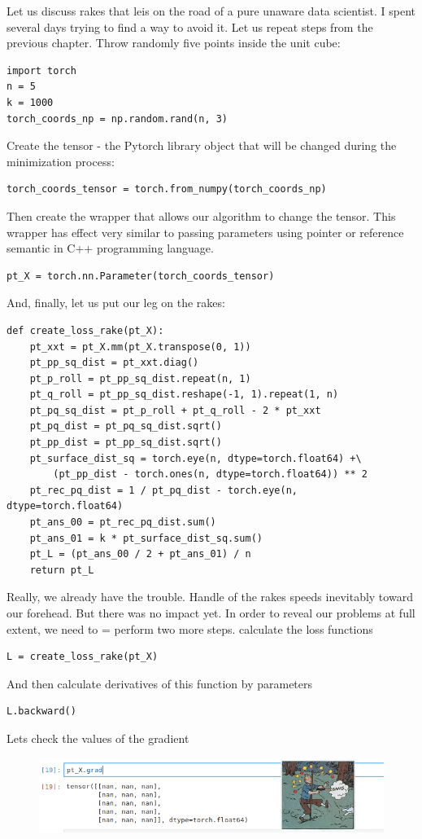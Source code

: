 \documentclass[12pt]{extarticle}
\begin{document}
Let us discuss rakes that leis on the road of a pure unaware
data scientist.
%
I spent several days trying to find a way to avoid it.
%
Let us repeat steps from the previous chapter.
%
Throw randomly five points inside the unit cube:
\begin{lstlisting}[frame=single]
import torch
n = 5
k = 1000
torch_coords_np = np.random.rand(n, 3)
\end{lstlisting}
%
Create the tensor - the Pytorch library object that will be changed
during the minimization process:
\begin{lstlisting}[frame=single]
torch_coords_tensor = torch.from_numpy(torch_coords_np)
\end{lstlisting}
%
Then create the wrapper that allows our algorithm to change
the tensor.
%
This wrapper has effect very similar to passing parameters
using pointer or reference semantic in C++ programming language.
%
\begin{lstlisting}[frame=single]
 pt_X = torch.nn.Parameter(torch_coords_tensor)
\end{lstlisting}
%
And, finally, let us put our leg on the rakes:
%
\begin{lstlisting}[frame=single]
def create_loss_rake(pt_X):
    pt_xxt = pt_X.mm(pt_X.transpose(0, 1))
    pt_pp_sq_dist = pt_xxt.diag()
    pt_p_roll = pt_pp_sq_dist.repeat(n, 1)
    pt_q_roll = pt_pp_sq_dist.reshape(-1, 1).repeat(1, n)
    pt_pq_sq_dist = pt_p_roll + pt_q_roll - 2 * pt_xxt 
    pt_pq_dist = pt_pq_sq_dist.sqrt()
    pt_pp_dist = pt_pp_sq_dist.sqrt()
    pt_surface_dist_sq = torch.eye(n, dtype=torch.float64) +\
        (pt_pp_dist - torch.ones(n, dtype=torch.float64)) ** 2
    pt_rec_pq_dist = 1 / pt_pq_dist - torch.eye(n, dtype=torch.float64)
    pt_ans_00 = pt_rec_pq_dist.sum()
    pt_ans_01 = k * pt_surface_dist_sq.sum()
    pt_L = (pt_ans_00 / 2 + pt_ans_01) / n
    return pt_L
\end{lstlisting}
%
Really, we already have the trouble.
%
Handle of the rakes speeds inevitably toward our forehead.
%
But there was no impact yet.
%
In order to reveal our problems at full extent, we need to =
perform two more steps.
%
calculate the loss functions
\begin{lstlisting}[frame=single]
L = create_loss_rake(pt_X)
\end{lstlisting}
%
And then calculate derivatives of this function by parameters
%
\begin{lstlisting}[frame=single]
L.backward()
\end{lstlisting}
%
Lets check the values of the gradient
\begin{figure}[h]
\centering\includegraphics[width=.99\hsize]{pics/rakes_grad.png}
\end{figure}
\end{document}
